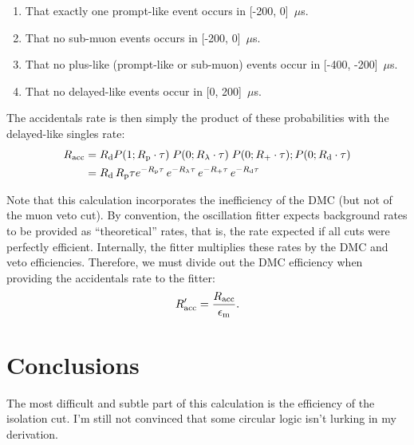 \documentclass[../thesis.tex]{subfiles}
\begin{document}
\begin{enumerate}
\item That exactly one prompt-like event occurs in [-200, 0]~$\mu$s.
\item That no sub-muon events occurs in [-200, 0]~$\mu$s.
\item That no plus-like (prompt-like or sub-muon) events occur in [-400, -200]~$\mu$s.
\item That no delayed-like events occur in [0, 200]~$\mu$s.
\end{enumerate}

\def\Racc{\ensuremath{R_\mathrm{acc}}}

The accidentals rate is then simply the product of these probabilities with the delayed-like singles rate:
\begin{align}
  \Racc &= \Rdel P(1; \Rpro \cdot \tau)\;P(0; \Rsub \cdot \tau)\;P(0; \Rplu \cdot \tau);P(0; \Rdel \cdot \tau) \nonumber \\
        &= \Rdel\,\Rpro\tau e^{-\Rpro\tau}\,e^{-\Rsub\tau}\,e^{-\Rplu\tau}\,e^{-\Rdel\tau}
\end{align}

Note that this calculation incorporates the inefficiency of the DMC (but not of the muon veto cut). By convention, the oscillation fitter expects background rates to be provided as ``theoretical'' rates, that is, the rate expected if all cuts were perfectly efficient. Internally, the fitter multiplies these rates by the DMC and veto efficiencies. Therefore, we must divide out the DMC efficiency when providing the accidentals rate to the fitter:
\begin{equation}
  \Racc' = \frac{\Racc}{\edmc}.
\end{equation}

\section{Conclusions}
\label{sec:accdmcconcl}

The most difficult and subtle part of this calculation is the efficiency of the isolation cut. I'm still not convinced that some circular logic isn't lurking in my derivation.
\end{document}
